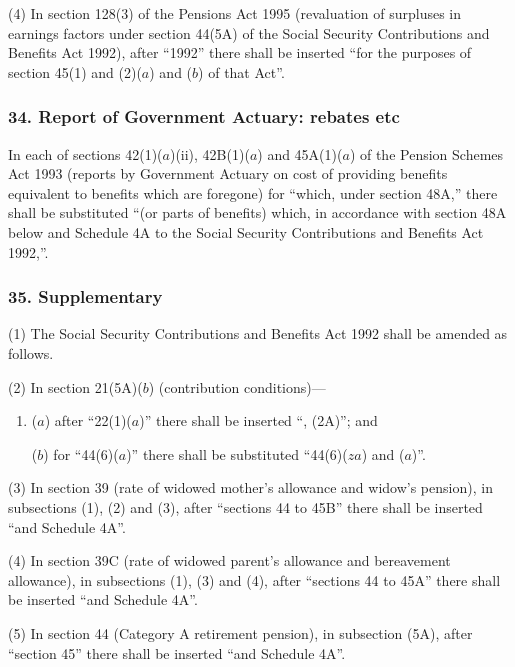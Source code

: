 \documentclass[12pt,a4paper]{article}
\begin{document}
(4) In section 128(3)  of the Pensions Act 1995 (revaluation of surpluses in earnings factors under section 44(5A)  of the Social Security Contributions and Benefits Act 1992), after “1992” there shall be inserted “for the purposes of section 45(1)  and (2)($a$)  and ($b$)  of that Act”.


\subsubsection{34. Report of Government Actuary: rebates etc}

In each of sections 42(1)($a$)(ii), 42B(1)($a$)  and 45A(1)($a$)  of the Pension Schemes Act 1993 (reports by Government Actuary on cost of providing benefits equivalent to benefits which are foregone) for “which, under section 48A,” there shall be substituted “(or parts of benefits) which, in accordance with section 48A below and Schedule 4A to the Social Security Contributions and Benefits Act 1992,”.


\subsubsection{35. Supplementary}

(1) The Social Security Contributions and Benefits Act 1992 shall be amended as follows.

(2) In section 21(5A)($b$)  (contribution conditions)—
\begin{enumerate}\item[]
($a$) after “22(1)($a$)” there shall be inserted “, (2A)”; and

($b$) for “44(6)($a$)” there shall be substituted “44(6)($za$)  and ($a$)”.
\end{enumerate}

(3) In section 39 (rate of widowed mother’s allowance and widow’s pension), in subsections (1), (2)  and (3), after “sections 44 to 45B” there shall be inserted “and Schedule 4A”.

(4) In section 39C (rate of widowed parent’s allowance and bereavement allowance), in subsections (1), (3)  and (4), after “sections 44 to 45A” there shall be inserted “and Schedule 4A”.

(5) In section 44 (Category A retirement pension), in subsection (5A), after “section 45” there shall be inserted “and Schedule 4A”.
\end{document}
